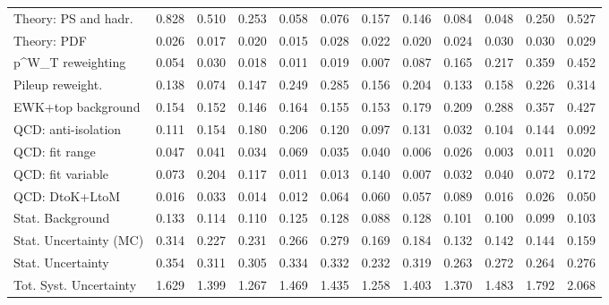 \begin{tabular}{l|p{0.6cm}p{0.6cm}p{0.6cm}p{0.6cm}p{0.6cm}p{0.6cm}p{0.6cm}p{0.6cm}p{0.6cm}p{0.6cm}p{0.6cm}}
Theory: PS and hadr.                     & 0.828 & 0.510 & 0.253 & 0.058 & 0.076 & 0.157 & 0.146 & 0.084 & 0.048 & 0.250 & 0.527 \\
Theory: PDF                              & 0.026 & 0.017 & 0.020 & 0.015 & 0.028 & 0.022 & 0.020 & 0.024 & 0.030 & 0.030 & 0.029 \\
p^{W}_{T} reweighting                    & 0.054 & 0.030 & 0.018 & 0.011 & 0.019 & 0.007 & 0.087 & 0.165 & 0.217 & 0.359 & 0.452 \\
Pileup reweight.                         & 0.138 & 0.074 & 0.147 & 0.249 & 0.285 & 0.156 & 0.204 & 0.133 & 0.158 & 0.226 & 0.314 \\
EWK+top background                       & 0.154 & 0.152 & 0.146 & 0.164 & 0.155 & 0.153 & 0.179 & 0.209 & 0.288 & 0.357 & 0.427 \\
QCD: anti-isolation                      & 0.111 & 0.154 & 0.180 & 0.206 & 0.120 & 0.097 & 0.131 & 0.032 & 0.104 & 0.144 & 0.092 \\
QCD: fit range                           & 0.047 & 0.041 & 0.034 & 0.069 & 0.035 & 0.040 & 0.006 & 0.026 & 0.003 & 0.011 & 0.020 \\
QCD: fit variable                        & 0.073 & 0.204 & 0.117 & 0.011 & 0.013 & 0.140 & 0.007 & 0.032 & 0.040 & 0.072 & 0.172 \\
QCD: DtoK+LtoM                           & 0.016 & 0.033 & 0.014 & 0.012 & 0.064 & 0.060 & 0.057 & 0.089 & 0.016 & 0.026 & 0.050 \\
Stat. Background                         & 0.133 & 0.114 & 0.110 & 0.125 & 0.128 & 0.088 & 0.128 & 0.101 & 0.100 & 0.099 & 0.103 \\
Stat. Uncertainty (MC)                   & 0.314 & 0.227 & 0.231 & 0.266 & 0.279 & 0.169 & 0.184 & 0.132 & 0.142 & 0.144 & 0.159 \\
\hline
Stat. Uncertainty                        & 0.354 & 0.311 & 0.305 & 0.334 & 0.332 & 0.232 & 0.319 & 0.263 & 0.272 & 0.264 & 0.276 \\
\hline
Tot. Syst. Uncertainty                   & 1.629 & 1.399 & 1.267 & 1.469 & 1.435 & 1.258 & 1.403 & 1.370 & 1.483 & 1.792 & 2.068 \\
\hline
\end{tabular}
